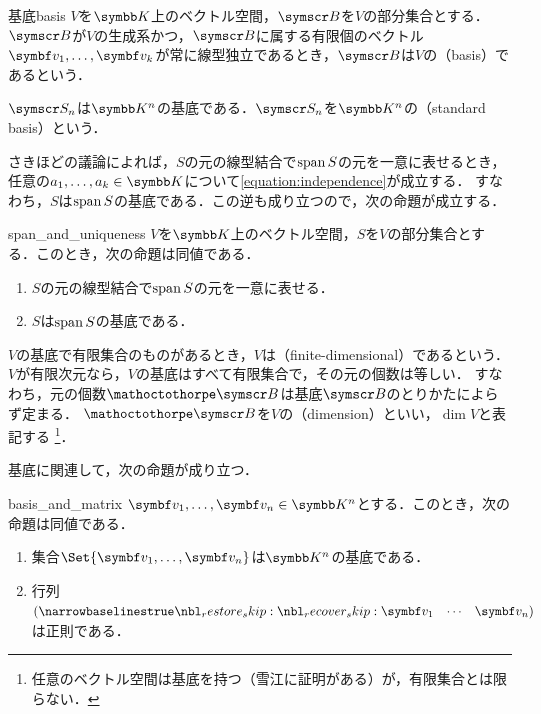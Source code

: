 \documentclass[../../main]{subfiles}
\begin{document}
\begin{definition}{基底}{basis}
  \(V\)を\(\numset{K}\)上のベクトル空間，\(\basis{B}\)を\(V\)の部分集合とする．
  \(\basis{B}\)が\(V\)の生成系かつ，\(\basis{B}\)に属する有限個のベクトル\(\vect{v}_1,\dots,\vect{v}_k\)が常に線型独立であるとき，\(\basis{B}\)は\(V\)の（basis）であるという．
\end{definition}

\begin{example}[標準基底]
  \(\basis{S}_n\)は\(\numset{K}^n\)の基底である．\(\basis{S}_n\)を\(\numset{K}^n\)の（standard basis）という．
\end{example}

さきほどの議論によれば，\(S\)の元の線型結合で\(\operatorname{span} S\)の元を一意に表せるとき，任意の\(a_1,\dots,a_k\in\numset{K}\)について\cref{equation:independence}が成立する．
すなわち，\(S\)は\(\operatorname{span} S\)の基底である．この逆も成り立つので，次の命題が成立する．

\begin{proposition}{}{span_and_uniqueness}
  \(V\)を\(\numset{K}\)上のベクトル空間，\(S\)を\(V\)の部分集合とする．このとき，次の命題は同値である．
  \begin{enumerate}
    \item \(S\)の元の線型結合で\(\operatorname{span} S\)の元を一意に表せる．
    \item \(S\)は\(\operatorname{span} S\)の基底である．
  \end{enumerate}
\end{proposition}

\(V\)の基底で有限集合のものがあるとき，\(V\)は（finite-dimensional）であるという．
\(V\)が有限次元なら，\(V\)の基底はすべて有限集合で，その元の個数は等しい．
すなわち，元の個数\(\sizeof{\basis{B}}\)は基底\(\basis{B}\)のとりかたによらず定まる．
\(\sizeof{\basis{B}}\)を\(V\)の（dimension）といい，\(\dim V\)と表記する
\footnote{任意のベクトル空間は基底を持つ（雪江\cite{yukie2019}に証明がある）が，有限集合とは限らない．}．

基底に関連して，次の命題が成り立つ．

\begin{proposition}{}{basis_and_matrix}
  \(\vect{v}_1,\dots,\vect{v}_n\in\numset{K}^n\)とする．このとき，次の命題は同値である．
  \begin{enumerate}
    \item 集合\(\Set{\vect{v}_1,\dots,\vect{v}_n}\)は\(\numset{K}^n\)の基底である．
    \item 行列\(\rowvect{\vect{v}_1 & \cdots & \vect{v}_n}\)は正則である．
  \end{enumerate}
\end{proposition}
\end{document}
